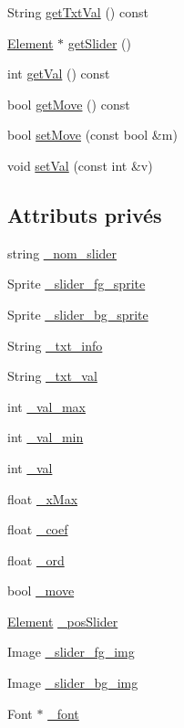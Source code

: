 \begin{DoxyCompactItemize}
String \hyperlink{classSlider_a1f28b7c19befa04b5ab9a81a656dd4d6}{getTxtVal} () const 
\item 
\hyperlink{classElement}{Element} $\ast$ \hyperlink{classSlider_a99cfa405caba2e47742356e613b1bdb2}{getSlider} ()
\item 
int \hyperlink{classSlider_affa966949b902f5c6e5ce247f60d146a}{getVal} () const 
\item 
bool \hyperlink{classSlider_ab866f95e83919b2bdf2c8b77d69e6d32}{getMove} () const 
\item 
bool \hyperlink{classSlider_a4404c4276e99e549a42971265b7d9244}{setMove} (const bool \&m)
\item 
void \hyperlink{classSlider_ac1bc89b00129f7b3c6e038686ccbc75a}{setVal} (const int \&v)
\end{DoxyCompactItemize}
\subsection*{Attributs privés}
\begin{DoxyCompactItemize}
\item 
string \hyperlink{classSlider_aa809f4dfd9abb3219cd1c4608b62db0f}{\_\-nom\_\-slider}
\item 
Sprite \hyperlink{classSlider_ac3ebf72532424d4c6ff3d55d17603329}{\_\-slider\_\-fg\_\-sprite}
\item 
Sprite \hyperlink{classSlider_a61f9a9de299c71d1e0c9b7f34cdb0686}{\_\-slider\_\-bg\_\-sprite}
\item 
String \hyperlink{classSlider_a7d5c3a64d2de3abdd12c183fc1b1546d}{\_\-txt\_\-info}
\item 
String \hyperlink{classSlider_a2255962c631968273194f5c877b76fbc}{\_\-txt\_\-val}
\item 
int \hyperlink{classSlider_a1eb39685205c3104c0ef91ebb136b51b}{\_\-val\_\-max}
\item 
int \hyperlink{classSlider_a78852b38126a5e396b380d774b325de5}{\_\-val\_\-min}
\item 
int \hyperlink{classSlider_a77b1b05f61d4fc37ba2d84439b19da88}{\_\-val}
\item 
float \hyperlink{classSlider_ab86797eb102b82c5f3974b4d3df03707}{\_\-xMax}
\item 
float \hyperlink{classSlider_a63a07bf3bd7f8cde11563746a54b9d7b}{\_\-coef}
\item 
float \hyperlink{classSlider_a9ef1ee931b3f1bdf217083125ed85f86}{\_\-ord}
\item 
bool \hyperlink{classSlider_a8b223411b6bc8db5b944da518667cb67}{\_\-move}
\item 
\hyperlink{classElement}{Element} \hyperlink{classSlider_a8132a5f2b00e817f9dd9ee087272124a}{\_\-posSlider}
\item 
Image \hyperlink{classSlider_a761c0d7f4ebbeefe8607db849830af25}{\_\-slider\_\-fg\_\-img}
\item 
Image \hyperlink{classSlider_a1cb0a3c82107ef0b9edaa1ae7e107c90}{\_\-slider\_\-bg\_\-img}
\item 
Font $\ast$ \hyperlink{classSlider_a4e4996aa8b595c6b012d645af3f7c97d}{\_\-font}
\end{DoxyCompactItemize}


